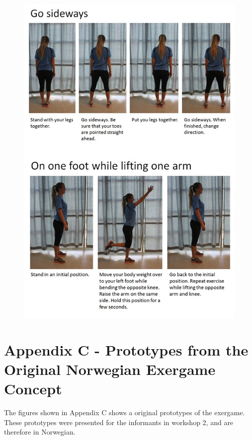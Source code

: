 \begin{figure} [H]
\centering
\includegraphics[scale=0.8]{GoSideways.jpg}
\label{app:gosideways}
\end{figure} 

\newpage
\section*{Appendix C - Prototypes from the Original Norwegian Exergame Concept}
\label{app:concept}

The figures shown in Appendix C shows a original prototypes of the exergame. These prototypes were presented for the informants in workshop 2, and are therefore in Norwegian.


